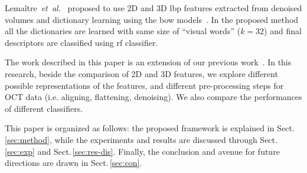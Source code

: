 Lema\^{i}tre~\emph{et~al.}~\cite{Lemaintre2015miccaiOCT} proposed to use 2D and 3D \gls{lbp} features extracted from denoised volumes and dictionary learning using the \gls{bow} models~\cite{Sivic2003}.
In the proposed method all the dictionaries are learned with same size of ``visual words'' ($k = 32$) and final descriptors are classified using \gls{rf} classifier.

The work described in this paper is an extension of our previous work~\cite{Lemaintre2015miccaiOCT}.
In this research, beside the comparison of 2D and 3D features, we explore different possible representations of the features, and different pre-processing steps for OCT data (i.e. aligning, flattening, denoising). 
We also compare the performances of different classifiers. 
 
 
This paper is organized as follows: the proposed framework is explained in Sect.\,\ref{sec:method}, while the experiments and results are discussed through Sect.\,\ref{sec:exp} and Sect.\,\ref{sec:res-dis}.
Finally, the conclusion and avenue for future directions are drawn in Sect.\,\ref{sec:con}.

